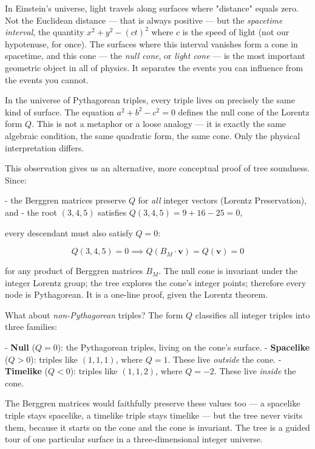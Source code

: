 

In Einstein's universe, light travels along surfaces where "distance" equals zero. Not the Euclidean distance --- that is always positive --- but the \textit{spacetime interval}, the quantity $x^2 + y^2 - (ct)^2$ where $c$ is the speed of light (not our hypotenuse, for once). The surfaces where this interval vanishes form a cone in spacetime, and this cone --- the \textit{null cone}, or \textit{light cone} --- is the most important geometric object in all of physics. It separates the events you can influence from the events you cannot.

In the universe of Pythagorean triples, every triple lives on precisely the same kind of surface. The equation $a^2 + b^2 - c^2 = 0$ defines the null cone of the Lorentz form $Q$. This is not a metaphor or a loose analogy --- it is exactly the same algebraic condition, the same quadratic form, the same cone. Only the physical interpretation differs.

This observation gives us an alternative, more conceptual proof of tree soundness. Since:

- the Berggren matrices preserve $Q$ for \textit{all} integer vectors (Lorentz Preservation), and
- the root $(3, 4, 5)$ satisfies $Q(3, 4, 5) = 9 + 16 - 25 = 0$,

every descendant must also satisfy $Q = 0$:

\[Q(3, 4, 5) = 0 \implies Q(B_M \cdot \mathbf{v}) = Q(\mathbf{v}) = 0\]

for any product of Berggren matrices $B_M$. The null cone is invariant under the integer Lorentz group; the tree explores the cone's integer points; therefore every node is Pythagorean. It is a one-line proof, given the Lorentz theorem.

What about \textit{non-Pythagorean} triples? The form $Q$ classifies all integer triples into three families:

- \textbf{Null} ($Q = 0$): the Pythagorean triples, living on the cone's surface.
- \textbf{Spacelike} ($Q > 0$): triples like $(1, 1, 1)$, where $Q = 1$. These live \textit{outside} the cone.
- \textbf{Timelike} ($Q < 0$): triples like $(1, 1, 2)$, where $Q = -2$. These live \textit{inside} the cone.

The Berggren matrices would faithfully preserve these values too --- a spacelike triple stays spacelike, a timelike triple stays timelike --- but the tree never visits them, because it starts on the cone and the cone is invariant. The tree is a guided tour of one particular surface in a three-dimensional integer universe.


